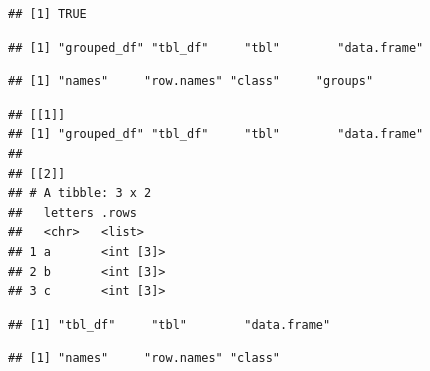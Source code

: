 \documentclass[krantz2]{krantz}\usepackage{knitr}
\begin{document}
\begin{warningbox}
\begin{knitrout}\footnotesize
{}\color{fgcolor}\begin{kframe}
\begin{alltt}
 \hlkwb{<-} \hlstd{(} 
\end{alltt}
\begin{verbatim}
## [1] TRUE
\end{verbatim}
\begin{alltt}
\end{alltt}
\begin{verbatim}
## [1] "grouped_df" "tbl_df"     "tbl"        "data.frame"
\end{verbatim}
\begin{alltt}
\hlstd{(}
\end{alltt}
\begin{verbatim}
## [1] "names"     "row.names" "class"     "groups"
\end{verbatim}
\begin{alltt}
\hlstd{(} 
\end{alltt}
\begin{verbatim}
## [[1]]
## [1] "grouped_df" "tbl_df"     "tbl"        "data.frame"
## 
## [[2]]
## # A tibble: 3 x 2
##   letters .rows    
##   <chr>   <list>   
## 1 a       <int [3]>
## 2 b       <int [3]>
## 3 c       <int [3]>
\end{verbatim}
\end{kframe}
\end{knitrout}

\begin{knitrout}\footnotesize
{}\color{fgcolor}\begin{kframe}
\begin{alltt}
 \hlkwb{<-} 
\end{alltt}
\begin{verbatim}
## [1] "tbl_df"     "tbl"        "data.frame"
\end{verbatim}
\begin{alltt}
\hlstd{(}
\end{alltt}
\begin{verbatim}
## [1] "names"     "row.names" "class"
\end{verbatim}
\end{kframe}
\end{knitrout}


\end{warningbox}
\end{document}
